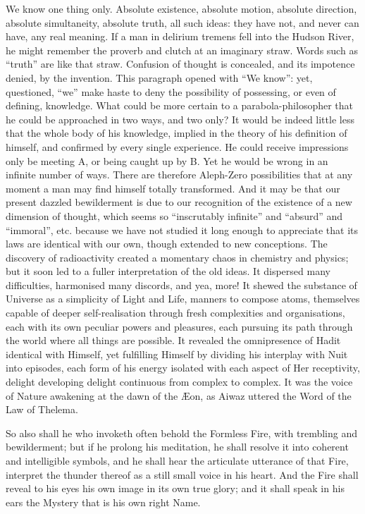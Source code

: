 We know one thing only. Absolute existence, absolute motion, absolute direction, absolute simultaneity, absolute truth, all such ideas: they have not, and never can have, any real meaning. If a man in delirium tremens fell into the Hudson River, he might remember the proverb and clutch at an imaginary straw. Words such as \enquote{truth} are like that straw. Confusion of thought is concealed, and its impotence denied, by the invention. This paragraph opened with \enquote{We know}: yet, questioned, \enquote{we} make haste to deny the possibility of possessing, or even of defining, knowledge. What could be more certain to a parabola-philosopher that he could be approached in two ways, and two only? It would be indeed little less that the whole body of his knowledge, implied in the theory of his definition of himself, and confirmed by every single experience. He could receive impressions only be meeting A, or being caught up by B. Yet he would be wrong in an infinite number of ways. There are therefore Aleph-Zero possibilities that at any moment a man may find himself totally transformed. And it may be that our present dazzled bewilderment is due to our recognition of the existence of a new dimension of thought, which seems so \enquote{inscrutably infinite} and \enquote{absurd} and \enquote{immoral}, etc. \textemdash{} because we have not studied it long enough to appreciate that its laws are identical with our own, though extended to new conceptions. The discovery of radioactivity created a momentary chaos in chemistry and physics; but it soon led to a fuller interpretation of the old ideas. It dispersed many difficulties, harmonised many discords, and \textemdash{} yea, more! It shewed the substance of Universe as a simplicity of Light and Life, manners to compose atoms, themselves capable of deeper self-realisation through fresh complexities and organisations, each with its own peculiar powers and pleasures, each pursuing its path through the world where all things are possible. It revealed the omnipresence of Hadit identical with Himself, yet fulfilling Himself by dividing his interplay with Nuit into episodes, each form of his energy isolated with each aspect of Her receptivity, delight developing delight continuous from complex to complex. It was the voice of Nature awakening at the dawn of the \AE{}on, as Aiwaz uttered the Word of the Law of Thelema.

So also shall he who invoketh often behold the Formless Fire, with trembling and bewilderment; but if he prolong his meditation, he shall resolve it into coherent and intelligible symbols, and he shall hear the articulate utterance of that Fire, interpret the thunder thereof as a still small voice in his heart. And the Fire shall reveal to his eyes his own image in its own true glory; and it shall speak in his ears the Mystery that is his own right Name.

